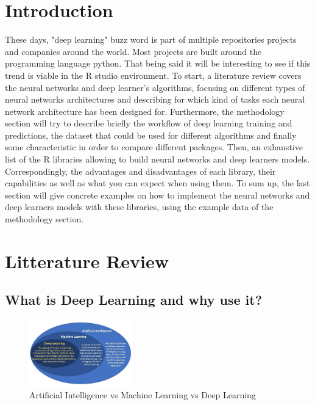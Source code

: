 \documentclass[letter,8pt]{article}\usepackage[]{graphicx}\usepackage[]{color}
\begin{document}
\section{Introduction}
These days, "deep learning" buzz word is part of multiple repositories projects and companies around the world. Most projects are built around the programming language python. That being said it will be interesting to see if this trend is viable in the R studio environment.
To start, a literature review covers the neural networks and deep learner’s algorithms, focusing on different types of neural networks architectures and describing for which kind of tasks each neural network architecture has been designed for. Furthermore, the methodology section will try to describe briefly the workflow of deep learning training and predictions, the dataset that could be used for different algorithms and finally some characteristic in order to compare different packages. Then, an exhaustive list of the R libraries allowing to build neural networks and deep learners models. Correspondingly, the advantages and disadvantages of each library, their capabilities as well as what you can expect when using them. To sum up, the last section will give concrete examples on how to implement the neural networks and deep learners models with these libraries, using the example data of the methodology section.



\section{Litterature Review}
\subsection{What is Deep Learning and why use it?}
\begin{figure}
  \begin{center}
    \includegraphics[width=0.4\textwidth]{figure/deep learning.PNG}
      \end{center}
     \caption{Artificial Intelligence vs Machine Learning vs Deep Learning \cite{aivsdeepvsml}}
     \label{fig:simule}
\end{figure}
\end{document}
